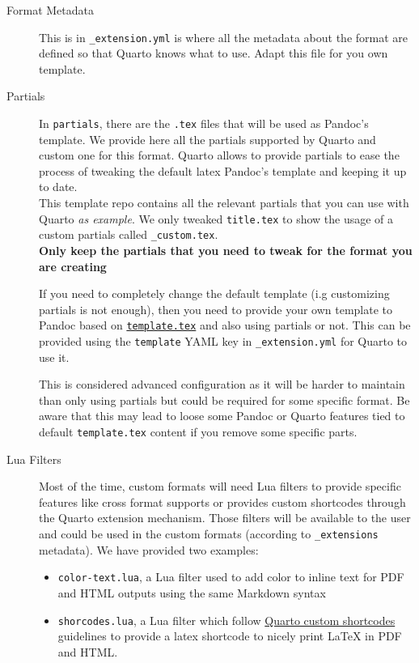 \documentclass[
  11pts,
]{article}
\providecommand{\tightlist}{%
  \setlength{\itemsep}{0pt}\setlength{\parskip}{0pt}}\usepackage{longtable,booktabs,array}
\begin{document}
\begin{description}
\item[Format Metadata]
This is in \texttt{\_extension.yml} is where all the metadata about the
format are defined so that Quarto knows what to use. Adapt this file for
you own template.
\item[Partials]
In \texttt{partials}, there are the \texttt{.tex} files that will be
used as Pandoc's template. We provide here all the partials supported by
Quarto and custom one for this format. Quarto allows to provide partials
to ease the process of tweaking the default latex Pandoc's template and
keeping it up to date.\\
This template repo contains all the relevant partials that you can use
with Quarto \emph{as example}. We only tweaked \texttt{title.tex} to
show the usage of a custom partials called \texttt{\_custom.tex}.\\
\textbf{Only keep the partials that you need to tweak for the format you
are creating}

If you need to completely change the default template (i.g customizing
partials is not enough), then you need to provide your own template to
Pandoc based on
\href{https://github.com/quarto-dev/quarto-cli/blob/main/src/resources/formats/pdf/pandoc/template.tex}{\texttt{template.tex}}
and also using partials or not. This can be provided using the
\texttt{template} YAML key in \texttt{\_extension.yml} for Quarto to use
it.

This is considered advanced configuration as it will be harder to
maintain than only using partials but could be required for some
specific format. Be aware that this may lead to loose some Pandoc or
Quarto features tied to default \texttt{template.tex} content if you
remove some specific parts.
\item[Lua Filters]
Most of the time, custom formats will need Lua filters to provide
specific features like cross format supports or provides custom
shortcodes through the Quarto extension mechanism. Those filters will be
available to the user and could be used in the custom formats (according
to \texttt{\_extensions} metadata). We have provided two examples:

\begin{itemize}
\tightlist
\item
  \texttt{color-text.lua}, a Lua filter used to add color to inline text
  for PDF and HTML outputs using the same Markdown syntax
\item
  \texttt{shorcodes.lua}, a Lua filter which follow
  \href{https://quarto.org/docs/authoring/shortcodes.html\#custom-shortcodes}{Quarto
  custom shortcodes} guidelines to provide a latex shortcode to nicely
  print LaTeX in PDF and HTML.
\end{itemize}


\end{description}
\end{document}
